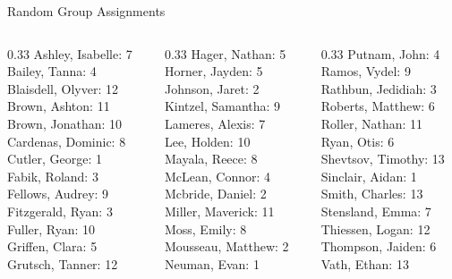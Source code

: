 \documentclass[10pt]{beamer}
\begin{document}
\begin{frame}{Random Group Assignments}
\begin{columns}
\begin{column}{0.33\textwidth}
Ashley, Isabelle: 7 \\ 
Bailey, Tanna: 4 \\ 
Blaisdell, Olyver: 12 \\ 
Brown, Ashton: 11 \\ 
Brown, Jonathan: 10 \\ 
Cardenas, Dominic: 8 \\ 
Cutler, George: 1 \\ 
Fabik, Roland: 3 \\ 
Fellows, Audrey: 9 \\ 
Fitzgerald, Ryan: 3 \\ 
Fuller, Ryan: 10 \\ 
Griffen, Clara: 5 \\ 
Grutsch, Tanner: 12 \\\end{column}
\begin{column}{0.33\textwidth}
Hager, Nathan: 5 \\ 
Horner, Jayden: 5 \\ 
Johnson, Jaret: 2 \\ 
Kintzel, Samantha: 9 \\ 
Lameres, Alexis: 7 \\ 
Lee, Holden: 10 \\ 
Mayala, Reece: 8 \\ 
McLean, Connor: 4 \\ 
Mcbride, Daniel: 2 \\ 
Miller, Maverick: 11 \\ 
Moss, Emily: 8 \\ 
Mousseau, Matthew: 2 \\ 
Neuman, Evan: 1 \\\end{column}
\begin{column}{0.33\textwidth}
Putnam, John: 4 \\ 
Ramos, Vydel: 9 \\ 
Rathbun, Jedidiah: 3 \\ 
Roberts, Matthew: 6 \\ 
Roller, Nathan: 11 \\ 
Ryan, Otis: 6 \\ 
Shevtsov, Timothy: 13 \\ 
Sinclair, Aidan: 1 \\ 
Smith, Charles: 13 \\ 
Stensland, Emma: 7 \\ 
Thiessen, Logan: 12 \\ 
Thompson, Jaiden: 6 \\ 
Vath, Ethan: 13 \\\end{column}
\end{columns}
\end{frame}
\end{document}
